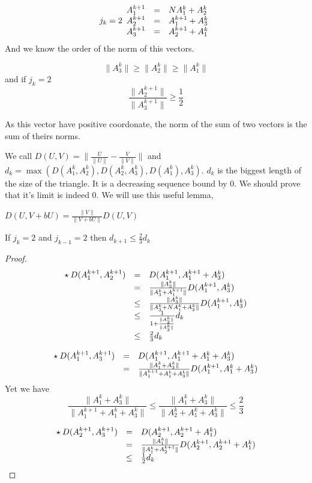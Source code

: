 \[j_k=2
\begin{array}{c c l}
A_1^{k+1} & = & N A_1^k+A_2^k\\
A_2^{k+1} & = & A_1^{k+1} + A_3^k \\
A_3^{k+1} & = & A_2^{k+1} + A_1^k
\end{array}
\]
And we know the order of the norm of this vectors.
\begin{lem}
\[
\|A_3^k \| \geq \|A_2^k\| \geq \|A_1^k \|
\]
and if $j_k=2$
\[
\frac{\|A_2^{k+1}\|}{\|A_3^{k+1}\|} \geq \frac{1}{2}
\]
\end{lem}
\begin{rmq}
As this vector have positive coordonate, the norm of the sum of two vectors is the sum of theirs norms.
\end{rmq}
We call $D(U,V)=\|\frac{U}{\|U \|}- \frac{V}{\|V\|}\|$ and $d_k=\max(D(A_1^k,A_2^k),D(A_2^k,A_3^k),D(A_1^k),A_3^k)$. $d_k$ is the biggest length of the size of the triangle. It is a decreasing sequence bound by $0$. We should prove that it's limit is indeed $0$.\newline
We will use this useful lemma,
\begin{lem}
 $D(U,V+b U)=\frac{\|V\|}{\|V+b U\|}D(U,V)$
\end{lem}
\begin{lem}
If $j_k=2$ and $j_{k-1}=2$ then $d_{k+1} \leq \frac{2}{3} d_k$
\end{lem}
\begin{proof}

\[
\begin{array}{c c l}
\star \: D(A_1^{k+1},A_2^{k+1}) & = & D(A_1^{k+1},A_1^{k+1}+A_3^k) \\
& = & \frac{\|A_3^k\|}{\|A_3^k+A_1^{k+1}\|}D(A_1^{k+1},A_3^k)\\
& \leq & \frac{\|A_3^k\|}{\|A_3^k+N A_1^k+A_2^k\|}D(A_1^{k+1},A_3^k)\\
& \leq & \frac{1}{1+\frac{\|A_2^k\|}{\|A_3^k\|}} d_k\\
& \leq & \frac{2}{3} d_k
\end{array}
\]

\[
\begin{array}{c c l}
\star \: D(A_1^{k+1},A_3^{k+1}) & = & D(A_1^{k+1},A_1^{k+1}+A_1^k+A_3^k)\\
 & = & \frac{\|A_1^k+A_3^k\|}{\|A_1^{k+1}+A_1^k+A_3^k\|}  D(A_1^{k+1},A_1^k+A_3^k) \\
\end{array}
\]
Yet we have \[
\frac{\|A_1^k+A_3^k\|}{\|A_1^{k+1}+A_1^k+A_3^k\|} \leq \frac{\|A_1^k+A_3^k\|}{\|A_2^k+A_1^k+A_3^k\|} \leq
\frac{2}{3}
\]


\[
\begin{array}{c c l}
\star \: D(A_2^{k+1},A_3^{k+1}) & = & D(A_2^{k+1},A_2^{k+1}+A_1^k) \\
& = &\frac{\|A_1^k\|}{\|A_1^k+A_2^{k+1}\|} D(A_2^{k+1},A_2^{k+1}+A_1^k)\\
& \leq & \frac{1}{2} d_k
\end{array}
\]
\end{proof}
